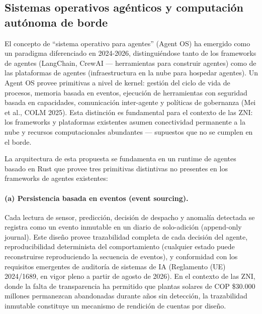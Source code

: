 \documentclass[12pt,letterpaper]{article}
\begin{document}
\subsection{Sistemas operativos ag\'enticos y computaci\'on aut\'onoma de borde}

El concepto de ``sistema operativo para agentes'' (Agent OS) ha emergido como un paradigma diferenciado en 2024-2026, distingui\'endose tanto de los frameworks de agentes (LangChain, CrewAI --- herramientas para construir agentes) como de las plataformas de agentes (infraestructura en la nube para hospedar agentes). Un Agent OS provee primitivas a nivel de kernel: gesti\'on del ciclo de vida de procesos, memoria basada en eventos, ejecuci\'on de herramientas con seguridad basada en capacidades, comunicaci\'on inter-agente y pol\'iticas de gobernanza (Mei et al., COLM 2025). Esta distinci\'on es fundamental para el contexto de las ZNI: los frameworks y plataformas existentes asumen conectividad permanente a la nube y recursos computacionales abundantes --- supuestos que no se cumplen en el borde.

La arquitectura de esta propuesta se fundamenta en un runtime de agentes basado en Rust que provee tres primitivas distintivas no presentes en los frameworks de agentes existentes:

\paragraph{(a) Persistencia basada en eventos (event sourcing).}
Cada lectura de sensor, predicci\'on, decisi\'on de despacho y anomal\'ia detectada se registra como un evento inmutable en un diario de solo-adici\'on (append-only journal). Este dise\~no provee trazabilidad completa de cada decisi\'on del agente, reproducibilidad determinista del comportamiento (cualquier estado puede reconstruirse reproduciendo la secuencia de eventos), y conformidad con los requisitos emergentes de auditor\'ia de sistemas de IA (Reglamento (UE) 2024/1689, en vigor pleno a partir de agosto de 2026). En el contexto de las ZNI, donde la falta de transparencia ha permitido que plantas solares de COP \$30.000 millones permanezcan abandonadas durante a\~nos sin detecci\'on, la trazabilidad inmutable constituye un mecanismo de rendici\'on de cuentas por dise\~no.
\end{document}
